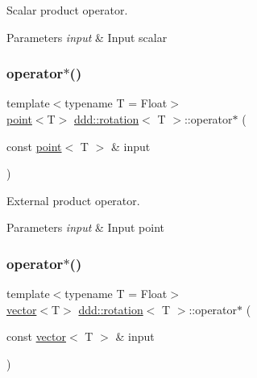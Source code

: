 Scalar product operator. 


\begin{DoxyParams}{Parameters}
{\em input} & Input scalar \\
\hline
\end{DoxyParams}
\mbox{\label{classddd_1_1rotation_a5761f38de833fde1a6c299ba1e1dc844}} 
\subsubsection{\texorpdfstring{operator$\ast$()}{operator*()}\hspace{0.1cm}{\footnotesize\ttfamily [2/4]}}
{\footnotesize\ttfamily template$<$typename T  = Float$>$ \\
\hyperlink{classddd_1_1point}{point}$<$T$>$ \hyperlink{classddd_1_1rotation}{ddd\+::rotation}$<$ T $>$\+::operator$\ast$ (\begin{DoxyParamCaption}\item[{const \hyperlink{classddd_1_1point}{point}$<$ T $>$ \&}]{input }\end{DoxyParamCaption})\hspace{0.3cm}{\ttfamily [inline]}}



External product operator. 


\begin{DoxyParams}{Parameters}
{\em input} & Input point \\
\hline
\end{DoxyParams}
\mbox{\label{classddd_1_1rotation_a1b55d8f810793caa469b12a2ca41ee6c}} 
\subsubsection{\texorpdfstring{operator$\ast$()}{operator*()}\hspace{0.1cm}{\footnotesize\ttfamily [3/4]}}
{\footnotesize\ttfamily template$<$typename T  = Float$>$ \\
\hyperlink{classddd_1_1vector}{vector}$<$T$>$ \hyperlink{classddd_1_1rotation}{ddd\+::rotation}$<$ T $>$\+::operator$\ast$ (\begin{DoxyParamCaption}\item[{const \hyperlink{classddd_1_1vector}{vector}$<$ T $>$ \&}]{input }\end{DoxyParamCaption})\hspace{0.3cm}{\ttfamily [inline]}}



